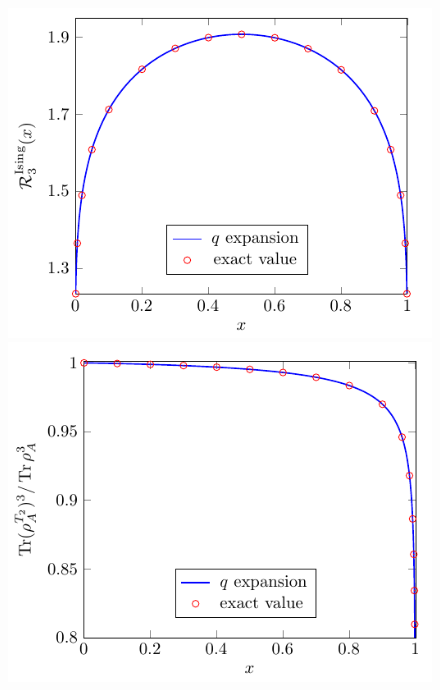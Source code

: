\documentclass[a4paper,11pt]{article}
\begin{document}
\begin{figure}[t]
 \begin{minipage}{0.5\linewidth}
 \centering 
 \includegraphics[width=\textwidth]{renyi_entropy_3_ising.pdf}
\end{minipage}
 \begin{minipage}{0.5\linewidth}
 \centering 
 \includegraphics[width=\textwidth]{quotient_negativity_entropy_3_ising.pdf}
\end{minipage}
\caption{}\label{fig:ent_ising}
\end{figure}
\end{document}
